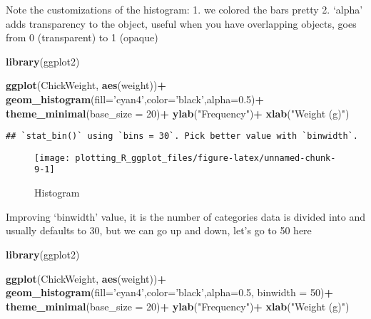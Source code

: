 \documentclass[
]{book}
\newenvironment{Shaded}{\begin{snugshade}}{\end{snugshade}}
\newcommand{\DataTypeTok}[1]{\textcolor[rgb]{0.13,0.29,0.53}{#1}}
\newcommand{\DecValTok}[1]{\textcolor[rgb]{0.00,0.00,0.81}{#1}}
\newcommand{\FloatTok}[1]{\textcolor[rgb]{0.00,0.00,0.81}{#1}}
\newcommand{\KeywordTok}[1]{\textcolor[rgb]{0.13,0.29,0.53}{\textbf{#1}}}
\newcommand{\NormalTok}[1]{#1}
\newcommand{\OperatorTok}[1]{\textcolor[rgb]{0.81,0.36,0.00}{\textbf{#1}}}
\newcommand{\StringTok}[1]{\textcolor[rgb]{0.31,0.60,0.02}{#1}}
\begin{document}
Note the customizations of the histogram:
1. we colored the bars pretty
2. `alpha' adds transparency to the object, useful when you have overlapping objects, goes from 0 (transparent) to 1 (opaque)

\begin{Shaded}
\begin{Highlighting}[]
\KeywordTok{library}\NormalTok{(ggplot2)}

\KeywordTok{ggplot}\NormalTok{(ChickWeight, }\KeywordTok{aes}\NormalTok{(weight))}\OperatorTok{+}
\StringTok{  }\KeywordTok{geom_histogram}\NormalTok{(}\DataTypeTok{fill=}\StringTok{'cyan4'}\NormalTok{,}\DataTypeTok{color=}\StringTok{'black'}\NormalTok{,}\DataTypeTok{alpha=}\FloatTok{0.5}\NormalTok{)}\OperatorTok{+}
\StringTok{  }\KeywordTok{theme_minimal}\NormalTok{(}\DataTypeTok{base_size =} \DecValTok{20}\NormalTok{)}\OperatorTok{+}
\StringTok{  }\KeywordTok{ylab}\NormalTok{(}\StringTok{"Frequency"}\NormalTok{)}\OperatorTok{+}\StringTok{ }\KeywordTok{xlab}\NormalTok{(}\StringTok{"Weight (g)"}\NormalTok{)}
\end{Highlighting}
\end{Shaded}

\begin{verbatim}
## `stat_bin()` using `bins = 30`. Pick better value with `binwidth`.
\end{verbatim}

\begin{figure}

{\centering \texttt{[image: plotting\_R\_ggplot\_files/figure-latex/unnamed-chunk-9-1]} 

}

\caption{Histogram}\label{fig:unnamed-chunk-9}
\end{figure}

Improving `binwidth' value, it is the number of categories data is divided into and usually defaults to 30, but we can go up and down, let's go to 50 here

\begin{Shaded}
\begin{Highlighting}[]
\KeywordTok{library}\NormalTok{(ggplot2)}

\KeywordTok{ggplot}\NormalTok{(ChickWeight, }\KeywordTok{aes}\NormalTok{(weight))}\OperatorTok{+}
\StringTok{  }\KeywordTok{geom_histogram}\NormalTok{(}\DataTypeTok{fill=}\StringTok{'cyan4'}\NormalTok{,}\DataTypeTok{color=}\StringTok{'black'}\NormalTok{,}\DataTypeTok{alpha=}\FloatTok{0.5}\NormalTok{, }\DataTypeTok{binwidth =} \DecValTok{50}\NormalTok{)}\OperatorTok{+}
\StringTok{  }\KeywordTok{theme_minimal}\NormalTok{(}\DataTypeTok{base_size =} \DecValTok{20}\NormalTok{)}\OperatorTok{+}
\StringTok{  }\KeywordTok{ylab}\NormalTok{(}\StringTok{"Frequency"}\NormalTok{)}\OperatorTok{+}\StringTok{ }\KeywordTok{xlab}\NormalTok{(}\StringTok{"Weight (g)"}\NormalTok{)}
\end{Highlighting}
\end{Shaded}
\end{document}
